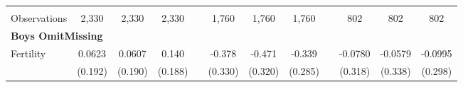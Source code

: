 \begin{landscape}
\begin{table}[htpb!]
\begin{center}
\begin{tabular}{lcccp{2mm}cccp{2mm}ccc}
\begin{footnotesize}\end{footnotesize}&\begin{footnotesize}\end{footnotesize}&\begin{footnotesize}\end{footnotesize}&\begin{footnotesize}\end{footnotesize}&\begin{footnotesize}\end{footnotesize}&\begin{footnotesize}\end{footnotesize}&\begin{footnotesize}\end{footnotesize}&\begin{footnotesize}\end{footnotesize}&\begin{footnotesize}\end{footnotesize}&\begin{footnotesize}\end{footnotesize}&\begin{footnotesize}\end{footnotesize}&\begin{footnotesize}\end{footnotesize}\\Observations&2,330&2,330&2,330&&1,760&1,760&1,760&&802&802&802\\
\multicolumn{12}{l}{\textbf{Boys OmitMissing}}\\ 
Fertility&0.0623&0.0607&0.140&&-0.378&-0.471&-0.339&&-0.0780&-0.0579&-0.0995\\
&(0.192)&(0.190)&(0.188)&&(0.330)&(0.320)&(0.285)&&(0.318)&(0.338)&(0.298)\\

\end{tabular}
\end{center}
\end{table}
\end{landscape}
